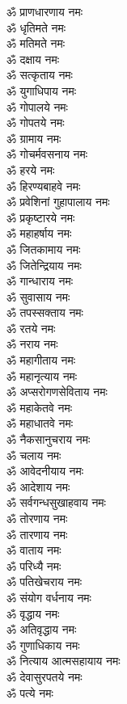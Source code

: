 \begin{multicols}{2}
\begin{flushleft}
ॐ प्राणधारणाय नमः\\
ॐ धृतिमते नमः\\
ॐ मतिमते नमः\\
ॐ दक्षाय नमः\\
ॐ सत्कृताय नमः\\
ॐ युगाधिपाय नमः\\
ॐ गोपालये नमः\\
ॐ गोपतये नमः\\
ॐ ग्रामाय नमः\hfill{}\\
ॐ गोचर्मवसनाय नमः\\
ॐ हरये नमः\\
ॐ हिरण्यबाहवे नमः\\
ॐ प्रवेशिनां गुहापालाय नमः\\
ॐ प्रकृष्टारये नमः\\
ॐ महाहर्षाय नमः\\
ॐ जितकामाय नमः\\
ॐ जितेन्द्रियाय नमः\\
ॐ गान्धाराय नमः\\
ॐ सुवासाय नमः\hfill{}\\
ॐ तपस्सक्ताय नमः\\
ॐ रतये नमः\\
ॐ नराय नमः\\
ॐ महागीताय नमः\\
ॐ महानृत्याय नमः\\
ॐ अप्सरोगणसेविताय नमः\\
ॐ महाकेतवे नमः\\
ॐ महाधातवे नमः\\
ॐ नैकसानुचराय नमः\\
ॐ चलाय नमः\hfill{}\\
ॐ आवेदनीयाय नमः\\
ॐ आदेशाय नमः\\
ॐ सर्वगन्धसुखाहवाय नमः\\
ॐ तोरणाय नमः\\
ॐ तारणाय नमः\\
ॐ वाताय नमः\\
ॐ परिध्यै नमः\\
ॐ पतिखेचराय नमः\\
ॐ संयोग वर्धनाय नमः\\
ॐ वृद्धाय नमः\hfill{}\\
ॐ अतिवृद्धाय नमः\\
ॐ गुणाधिकाय नमः\\
ॐ नित्याय आत्मसहायाय नमः\\
ॐ देवासुरपतये नमः\\
ॐ पत्ये नमः\\

\end{flushleft}
\end{multicols}

